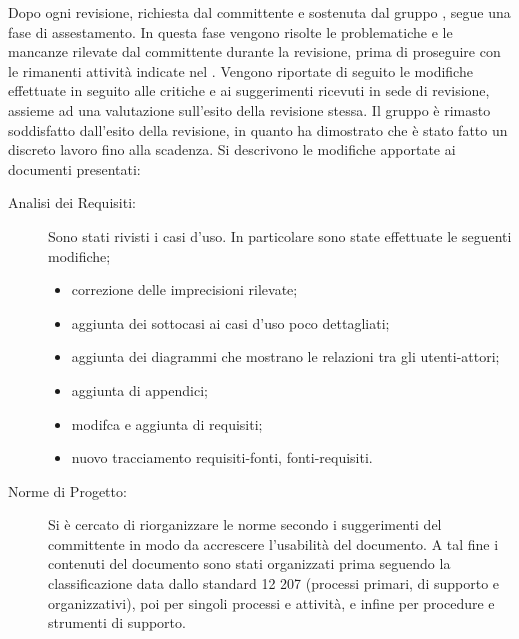 Dopo ogni revisione, richiesta dal committente e sostenuta dal gruppo \groupname{}, segue una fase di assestamento. In questa fase vengono risolte le problematiche e le mancanze rilevate dal committente durante la revisione, prima di proseguire con le rimanenti attività indicate nel .
Vengono riportate di seguito le modifiche effettuate in seguito alle critiche e ai suggerimenti ricevuti in sede di revisione, assieme ad una valutazione sull'esito della revisione stessa.
Il gruppo è rimasto soddisfatto dall'esito della revisione, in quanto ha dimostrato che è stato fatto un discreto lavoro fino alla scadenza.
Si descrivono le modifiche apportate ai documenti presentati:
\begin{description}
\item[Analisi dei Requisiti:] Sono stati rivisti i casi d'uso. In particolare sono state effettuate le seguenti modifiche;
\begin{itemize}
\item correzione delle imprecisioni rilevate;
\item aggiunta dei sottocasi ai casi d'uso poco dettagliati;
\item aggiunta dei diagrammi che mostrano le relazioni tra gli utenti-attori;
\item aggiunta di appendici;
\item modifca e aggiunta di requisiti;
\item nuovo tracciamento requisiti-fonti, fonti-requisiti.
\end{itemize}
\item[Norme di Progetto:] Si è cercato di riorganizzare le norme secondo i suggerimenti del committente in modo da accrescere l'usabilità del documento. A tal fine i contenuti del documento sono stati organizzati prima seguendo la classificazione data dallo standard 12 207 (processi primari, di supporto e organizzativi), poi per singoli processi e attività, e infine per procedure e strumenti di supporto.

\end{description}
